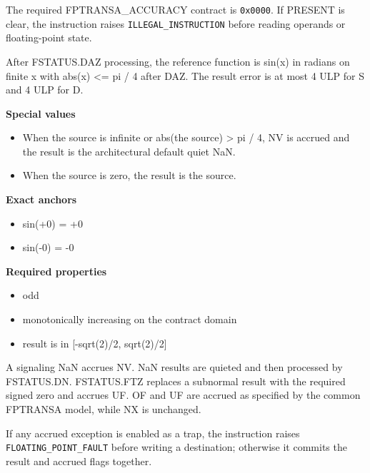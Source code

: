 The required FPTRANSA\_ACCURACY contract is \texttt{0x0000}. If PRESENT is clear, the instruction raises \texttt{ILLEGAL\_INSTRUCTION} before reading operands or floating-point state.

After FSTATUS.DAZ processing, the reference function is sin(x) in radians on finite x with abs(x) \textless{}= pi / 4 after DAZ. The result error is at most 4 ULP for S and 4 ULP for D.

\textbf{Special values}\par
\begin{itemize}
\item When the source is infinite or abs(the source) \textgreater{} pi / 4, NV is accrued and the result is the architectural default quiet NaN.
\item When the source is zero, the result is the source.
\end{itemize}

\textbf{Exact anchors}\par
\begin{itemize}
\item sin(+0) = +0
\item sin(-0) = -0
\end{itemize}

\textbf{Required properties}\par
\begin{itemize}
\item odd
\item monotonically increasing on the contract domain
\item result is in [-sqrt(2)/2, sqrt(2)/2]
\end{itemize}

A signaling NaN accrues NV. NaN results are quieted and then processed by FSTATUS.DN. FSTATUS.FTZ replaces a subnormal result with the required signed zero and accrues UF. OF and UF are accrued as specified by the common FPTRANSA model, while NX is unchanged.

If any accrued exception is enabled as a trap, the instruction raises \texttt{FLOATING\_POINT\_FAULT} before writing a destination; otherwise it commits the result and accrued flags together.
